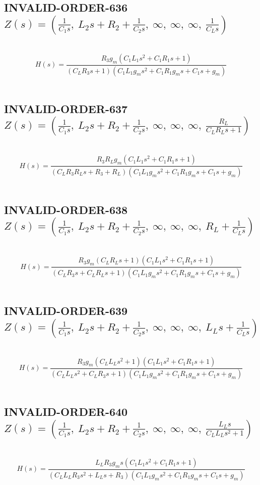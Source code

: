 \documentclass{article}
\begin{document}
\subsection{INVALID-ORDER-636 $Z(s) = \left( \frac{1}{C_{1} s}, \  L_{2} s + R_{2} + \frac{1}{C_{2} s}, \  \infty, \  \infty, \  \infty, \  \frac{1}{C_{L} s}\right)$ } \ 
\textbf{\[H(s) = \frac{R_{3} g_{m} \left(C_{1} L_{1} s^{2} + C_{1} R_{1} s + 1\right)}{\left(C_{L} R_{3} s + 1\right) \left(C_{1} L_{1} g_{m} s^{2} + C_{1} R_{1} g_{m} s + C_{1} s + g_{m}\right)}\] } \ 
\subsection{INVALID-ORDER-637 $Z(s) = \left( \frac{1}{C_{1} s}, \  L_{2} s + R_{2} + \frac{1}{C_{2} s}, \  \infty, \  \infty, \  \infty, \  \frac{R_{L}}{C_{L} R_{L} s + 1}\right)$ } \ 
\textbf{\[H(s) = \frac{R_{3} R_{L} g_{m} \left(C_{1} L_{1} s^{2} + C_{1} R_{1} s + 1\right)}{\left(C_{L} R_{3} R_{L} s + R_{3} + R_{L}\right) \left(C_{1} L_{1} g_{m} s^{2} + C_{1} R_{1} g_{m} s + C_{1} s + g_{m}\right)}\] } \ 
\subsection{INVALID-ORDER-638 $Z(s) = \left( \frac{1}{C_{1} s}, \  L_{2} s + R_{2} + \frac{1}{C_{2} s}, \  \infty, \  \infty, \  \infty, \  R_{L} + \frac{1}{C_{L} s}\right)$ } \ 
\textbf{\[H(s) = \frac{R_{3} g_{m} \left(C_{L} R_{L} s + 1\right) \left(C_{1} L_{1} s^{2} + C_{1} R_{1} s + 1\right)}{\left(C_{L} R_{3} s + C_{L} R_{L} s + 1\right) \left(C_{1} L_{1} g_{m} s^{2} + C_{1} R_{1} g_{m} s + C_{1} s + g_{m}\right)}\] } \ 
\subsection{INVALID-ORDER-639 $Z(s) = \left( \frac{1}{C_{1} s}, \  L_{2} s + R_{2} + \frac{1}{C_{2} s}, \  \infty, \  \infty, \  \infty, \  L_{L} s + \frac{1}{C_{L} s}\right)$ } \ 
\textbf{\[H(s) = \frac{R_{3} g_{m} \left(C_{L} L_{L} s^{2} + 1\right) \left(C_{1} L_{1} s^{2} + C_{1} R_{1} s + 1\right)}{\left(C_{L} L_{L} s^{2} + C_{L} R_{3} s + 1\right) \left(C_{1} L_{1} g_{m} s^{2} + C_{1} R_{1} g_{m} s + C_{1} s + g_{m}\right)}\] } \ 
\subsection{INVALID-ORDER-640 $Z(s) = \left( \frac{1}{C_{1} s}, \  L_{2} s + R_{2} + \frac{1}{C_{2} s}, \  \infty, \  \infty, \  \infty, \  \frac{L_{L} s}{C_{L} L_{L} s^{2} + 1}\right)$ } \ 
\textbf{\[H(s) = \frac{L_{L} R_{3} g_{m} s \left(C_{1} L_{1} s^{2} + C_{1} R_{1} s + 1\right)}{\left(C_{L} L_{L} R_{3} s^{2} + L_{L} s + R_{3}\right) \left(C_{1} L_{1} g_{m} s^{2} + C_{1} R_{1} g_{m} s + C_{1} s + g_{m}\right)}\] } \ 
\end{document}
